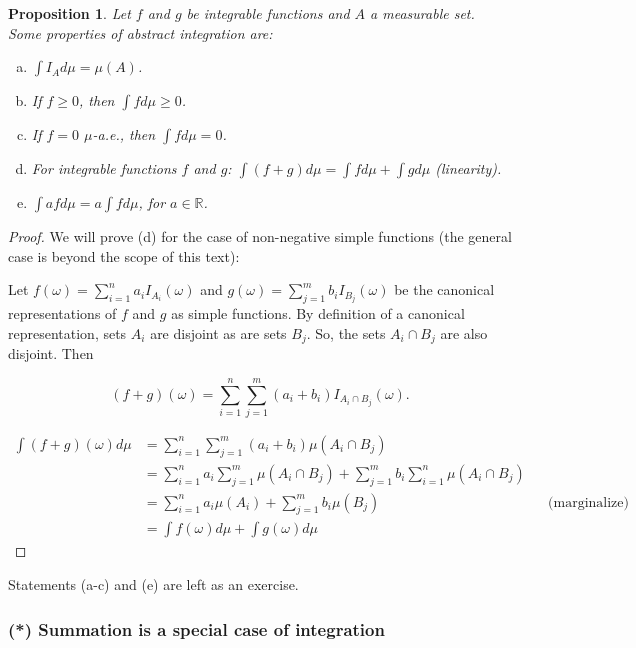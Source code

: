 \documentclass{book}
\theoremstyle{plain}%
\newtheorem{proposition}{Proposition}[section]
\theoremstyle{definition}
\begin{document}
\begin{proposition}

Let $f$ and $g$ be integrable functions and $A$ a measurable set. Some properties of abstract integration are:

\begin{enumerate}[(a)]
\item $\int I_A d\mu = \mu(A)$.
\item If $f \geq 0$, then $\int f d\mu \geq 0$.
\item If $f = 0$ $\mu$-a.e., then $\int f d\mu = 0$.
\item For integrable functions $f$ and $g$: $\int (f + g) d\mu = \int f d\mu + \int g d\mu$ \emph{(linearity)}.
\item $\int afd\mu = a \int fd\mu$, for $a \in \mathbb{R}$.
\end{enumerate}\label{prop:abstract}
\end{proposition}

\begin{proof}
We will prove (d) for the case of non-negative simple functions (the general case is beyond the scope of this text):

Let $f(\omega) = \sum_{i=1}^n a_i I_{A_i}(\omega)$ and  $g(\omega) = \sum_{j=1}^m b_i I_{B_j}(\omega)$ be the canonical representations of $f$ and $g$ as simple functions. By definition of a canonical representation, sets $A_i$ are disjoint as are sets $B_j$. So, the sets $A_i \cap B_j$ are also disjoint. Then

$$(f + g)(\omega) = \sum_{i=1}^n \sum_{j=1}^m (a_i + b_i) I_{A_i \cap B_j}(\omega).$$

\begin{align*}
\int (f + g)(\omega) d\mu &= \sum_{i=1}^n \sum_{j=1}^m (a_i + b_i) \mu(A_i \cap B_j) \\
&= \sum_{i=1}^n a_i \sum_{j=1}^m  \mu(A_i \cap B_j) + \sum_{j=1}^m b_i \sum_{i=1}^n \mu(A_i \cap B_j)  \\
&= \sum_{i=1}^n a_i
 \mu(A_i) + \sum_{j=1}^m b_i \mu(B_j) && \text{(marginalize)} \\
&= \int f(\omega) d\mu + \int g(\omega) d\mu  
\end{align*}
\end{proof}

Statements (a-c) and (e) are left as an exercise.


\subsubsection*{(*) Summation is a special case of integration}
\end{document}
